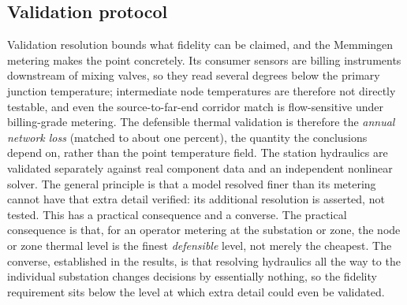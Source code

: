 \documentclass[a4paper,fleqn]{cas-sc}
\newcommand{\new}[1]{\textcolor[HTML]{1A5FB4}{#1}}   %
\newcommand{\new}[1]{#1}
\begin{document}
\subsection{Validation protocol}
\new{}

Validation resolution bounds what fidelity can be claimed, and the Memmingen metering makes the
point concretely. Its consumer sensors are billing instruments downstream of mixing valves, so
they read several degrees below the primary junction temperature; intermediate node temperatures
are therefore not directly testable, and even the source-to-far-end corridor match is
flow-sensitive under billing-grade metering. The defensible thermal validation is therefore the
\emph{annual network loss} (matched to about one percent), the quantity the conclusions depend
on, rather than the point temperature field. The station hydraulics are validated separately against real component data and an
independent nonlinear solver. The general principle is that a model resolved finer than its
metering cannot have that extra detail verified: its additional resolution is asserted, not
tested. This has a practical
consequence and a converse. The practical consequence is that, for an operator metering at the
substation or zone, the node or zone thermal level is the finest \emph{defensible} level, not
merely the cheapest. The converse, established in the results, is that resolving hydraulics all
the way to the individual substation changes decisions by essentially nothing, so the
fidelity requirement sits below the level at which extra detail could even be validated.
\end{document}
